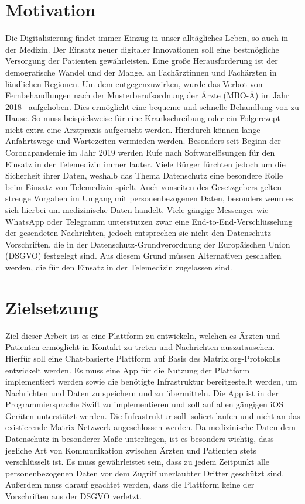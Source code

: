     \section{Motivation}\label{sec:motivation}
    Die Digitalisierung findet immer Einzug in unser alltägliches Leben, so auch in der Medizin.
    Der Einsatz neuer digitaler Innovationen soll eine bestmögliche Versorgung der Patienten gewährleisten.
    Eine große Herausforderung ist der demografische Wandel und der Mangel an Fachärztinnen und Fachärzten in ländlichen Regionen.
    Um dem entgegenzuwirken, wurde das Verbot von Fernbehandlungen nach der Musterberufsordnung der Ärzte (MBO-Ä) im Jahr 2018~\cite{beschlussprotokol} aufgehoben.
    Dies ermöglicht eine bequeme und schnelle Behandlung von zu Hause.
    So muss beispielsweise für eine Krankschreibung oder ein Folgerezept nicht extra eine Arztpraxis aufgesucht werden.
    Hierdurch können lange Anfahrtswege und Wartezeiten vermieden werden.
    Besonders seit Beginn der Coronapandemie im Jahr 2019 werden Rufe nach Softwarelösungen für den Einsatz in der Telemedizin immer lauter.
    Viele Bürger fürchten jedoch um die Sicherheit ihrer Daten, weshalb das Thema Datenschutz eine besondere Rolle beim Einsatz von Telemedizin spielt.
    Auch vonseiten des Gesetzgebers gelten strenge Vorgaben im Umgang mit personenbezogenen Daten, besonders wenn es sich hierbei um medizinische Daten handelt.
    Viele gängige Messenger wie WhatsApp oder Telegramm unterstützen zwar eine End-to-End-Verschlüsselung der gesendeten Nachrichten, jedoch entsprechen sie nicht den Datenschutz Vorschriften, die in der Datenschutz-Grundverordnung der Europäischen Union (DSGVO) festgelegt sind.
    Aus diesem Grund müssen Alternativen geschaffen werden, die für den Einsatz in der Telemedizin zugelassen sind.

    \newpage
    \section{Zielsetzung}\label{sec:zielsetzung}
    Ziel dieser Arbeit ist es eine Plattform zu entwickeln, welchen es Ärzten und Patienten ermöglicht in Kontakt zu treten und Nachrichten auszutauschen.
    Hierfür soll eine Chat-basierte Plattform auf Basis des Matrix.org-Protokolls entwickelt werden.
    Es muss eine App für die Nutzung der Plattform implementiert werden sowie die benötigte Infrastruktur bereitgestellt werden, um Nachrichten und Daten zu speichern und zu übermitteln.
    Die App ist in der Programmiersprache Swift zu implementieren und soll auf allen gängigen iOS Geräten unterstützt werden.
    Die Infrastruktur soll isoliert laufen und nicht an das existierende Matrix-Netzwerk angeschlossen werden.
    Da medizinische Daten dem Datenschutz in besonderer Maße unterliegen, ist es besonders wichtig,
    dass jegliche Art von Kommunikation zwischen Ärzten und Patienten stets verschlüsselt ist.
    Es muss gewährleistet sein, dass zu jedem Zeitpunkt alle personenbezogenen Daten vor dem Zugriff unerlaubter Dritter geschützt sind.
    Außerdem muss darauf geachtet werden, dass die Plattform keine der Vorschriften aus der DSGVO verletzt.

